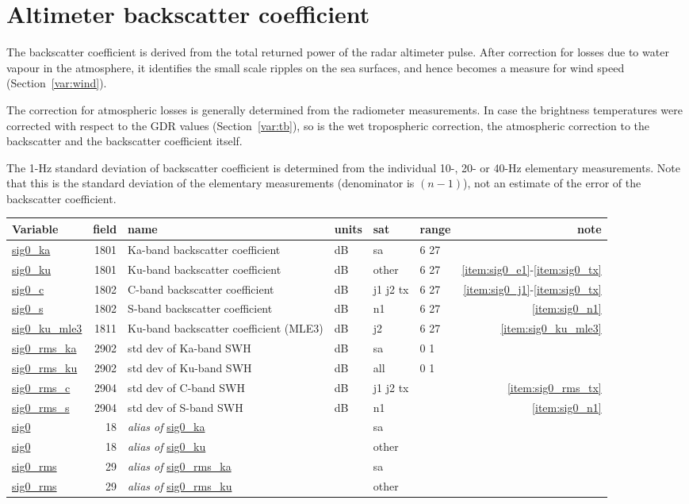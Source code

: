 \documentclass[a4paper,11pt,openany,natbib]{thesis}
\makeatletter
\newcommand\var[1]{\url{#1}\index{variables!#1@\protect\url{#1}}}
\newcommand\alias[1]{\emph{alias of} \var{#1}}
\newenvironment{vartable}{
\begin{table}[ht]
\small
\begin{tabular}{lrllllr}
\hline
Variable & field & name & units & sat & range & note \\
\hline
}{
\hline
\end{tabular}
\end{table}
}
\makeatother
\begin{document}
\section{Altimeter backscatter coefficient}
\label{var:sig0}
The backscatter coefficient is derived from the total returned power of the radar altimeter pulse. After correction for losses due to water vapour in the atmosphere, it identifies the small scale ripples on the sea surfaces, and hence becomes a measure for wind speed (Section~\ref{var:wind}).

The correction for atmospheric losses is generally determined from the radiometer measurements. In case the brightness temperatures were corrected with respect to the GDR values (Section~\ref{var:tb}), so is the wet tropospheric correction, the atmospheric correction to the backscatter and the backscatter coefficient itself.

The 1-Hz standard deviation of backscatter coefficient is determined from the individual 10-, 20- or 40-Hz elementary measurements. Note that this is the standard deviation of the elementary measurements (denominator is $(n-1)$), not an estimate of the error of the backscatter coefficient.

\begin{vartable}
\var{sig0_ka} & 1801 & Ka-band backscatter coefficient & dB & sa & 6 27 & \\
\var{sig0_ku} & 1801 & Ku-band backscatter coefficient & dB & other & 6 27 & \ref{item:sig0_e1}-\ref{item:sig0_tx} \\
\var{sig0_c} & 1802 & C-band backscatter coefficient & dB & j1 j2 tx & 6 27 & \ref{item:sig0_j1}-\ref{item:sig0_tx} \\
\var{sig0_s} & 1802 & S-band backscatter coefficient & dB & n1 & 6 27 & \ref{item:sig0_n1} \\
\var{sig0_ku_mle3} & 1811 & Ku-band backscatter coefficient (MLE3) & dB & j2 & 6 27 & \ref{item:sig0_ku_mle3} \\
\hline
\var{sig0_rms_ka} & 2902 & std dev of Ka-band SWH & dB & sa & 0 1 & \\
\var{sig0_rms_ku} & 2902 & std dev of Ku-band SWH & dB & all & 0 1 & \\
\var{sig0_rms_c} & 2904 & std dev of C-band SWH & dB & j1 j2 tx & & \ref{item:sig0_rms_tx} \\
\var{sig0_rms_s} & 2904 & std dev of S-band SWH & dB & n1 & & \ref{item:sig0_n1} \\
\hline
\var{sig0} & 18 & \alias{sig0_ka} && sa && \\
\var{sig0} & 18 & \alias{sig0_ku} && other && \\
\hline
\var{sig0_rms} & 29 & \alias{sig0_rms_ka} && sa && \\
\var{sig0_rms} & 29 & \alias{sig0_rms_ku} && other && \\
\end{vartable}
\end{document}
